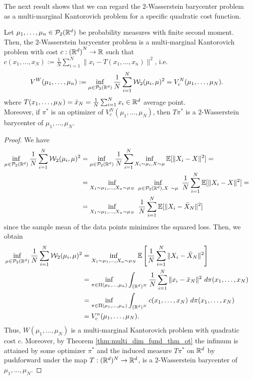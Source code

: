 \documentclass[../main.tex]{subfiles}
\begin{document}
The next result shows that we can regard the $2$-Wasserstein barycenter problem as a multi-marginal Kantorovich problem for a specific quadratic cost function.

\begin{theorem}
    Let $\mu_1, \dots, \mu_n\in\mathcal{P}_2(\mathbb{R}^d)$ be probability measures with finite second moment. Then, the $2$-Wasserstein barycenter problem is a multi-marginal Kantorovich problem with cost $c : {(\mathbb{R}^d)}^N \to \mathbb{R}$ such that $c(x_1, \dots, x_N) := \frac{1}{N} \sum_{i=1}^N \| x_i - T(x_1, \dots, x_n)\| ^2$, i.e.
    $$
    V^W(\mu_1, \dots, \mu_n) := \inf_{\mu\in\mathcal{P}_2(\mathbb{R}^d)} \frac{1}{N}\sum_{i=1}^N \mathcal{W}_2(\mu_i, \mu)^2
    = V^N_c(\mu_1, \dots, \mu_N).
    $$
    where $T(x_1, \dots, \mu_N) = \bar x_N = \frac{1}{N} \sum_{i=1}^N x_i \in \mathbb{R}^d$ average point. \\
    Moreover, if $\pi^*$ is an optimizer of $V^N_c(\mu_1, \dots, \mu_N)$, then $T\pi^*$ is a $2$-Wasserstein barycenter of $\mu_1, \dots, \mu_N$.
\end{theorem}
\begin{proof}
    We have
    \begin{align*}
        \inf_{\mu\in\mathcal{P}_2(\R^d)} \frac{1}{N}\sum_{i=1}^N \mathcal{W}_2(\mu_i, \mu)^2
        &=  \inf_{\mu\in\mathcal{P}_2(\R^d)} \frac{1}{N}\sum_{i=1}^N \inf_{X_i\sim\mu_i, X\sim\mu} \E[\|X_i - X\|^2] = \\
        &= \inf_{X_1\sim\mu_1, \dots, X_n\sim\mu_N} \ \inf_{\mu\in\mathcal{P}_2(\R^d), X\ \sim \mu} \  \frac{1}{N}\sum_{i=1}^N \E[\|X_i - X\|^2] = \\
        &= \inf_{X_1\sim\mu_1, \dots, X_n\sim\mu_N} \ \frac{1}{N}\sum_{i=1}^N \E[\|X_i - \bar X_N\|^2]
    \end{align*}
    since the sample mean of the data points minimizes the squared loss. Then, we obtain
    \begin{align*}
        \inf_{\mu\in\mathcal{P}_2(\mathbb{R}^d)} \frac{1}{N}\sum_{i=1}^N \mathcal{W}_2(\mu_i, \mu)^2
        &= \inf_{X_1\sim\mu_1, \dots, X_n\sim\mu_N} \mathbb{E}\left[\frac{1}{N}\sum_{i=1}^N \|X_i - \bar X_N\|^2\right] \\
        &= \inf_{\pi\in\Pi(\mu_1, \dots, \mu_n)} \int_{(\mathbb{R}^d)^N} \frac{1}{N}\sum_{i=1}^N \|x_i - \bar x_N\|^2 \ d\pi(x_1, \dots, x_N) \\
        &= \inf_{\pi\in\Pi(\mu_1, \dots, \mu_n)} \int_{(\mathbb{R}^d)^N} c(x_1, \dots, x_N) \ d\pi(x_1, \dots, x_N) \\
        &= V^n_c(\mu_1, \dots, \mu_N).
    \end{align*}
    Thus, $W(\mu_1, \dots, \mu_N)$ is a multi-marginal Kantorovich problem with quadratic cost $c$. Moreover, by Theorem \ref{thm:multi_dim_fund_thm_ot} the infimum is attained by some optimizer $\pi^*$ and the induced measure $T\pi^*$ on $\mathbb{R}^d$ by pushforward under the map $T: (\mathbb{R}^d)^N\to \mathbb{R}^d$, is a $2$-Wasserstein barycenter of $\mu_1,\dots, \mu_N$.
\end{proof}
\end{document}
